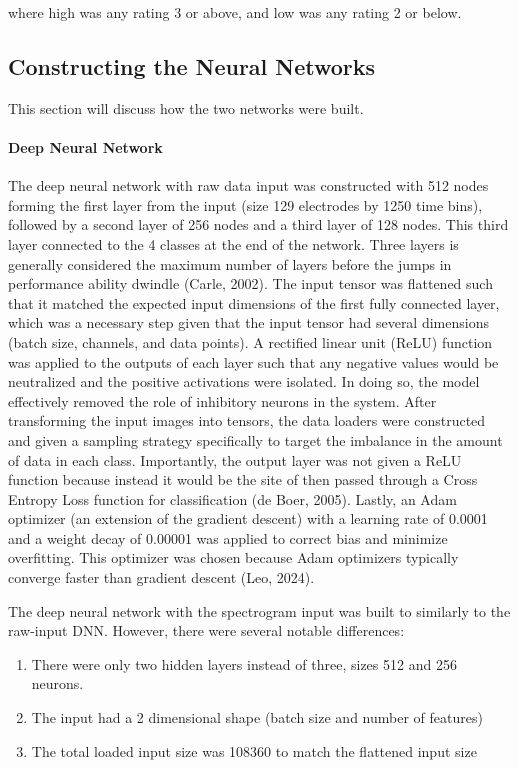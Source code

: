 \documentclass[fleqn,10pt]{SelfArx} %
\begin{document}
where high was any rating 3 or above, and low was any rating 2 or below.

\subsection{Constructing the Neural Networks}

This section will discuss how the two networks were built. 

\paragraph{Deep Neural Network} 

The  deep neural network with raw data input was constructed with 512 nodes forming the first layer from the input (size 129 electrodes by 1250 time bins), followed by a second layer of 256 nodes and a third layer of 128 nodes. This third layer connected to the 4 classes at the end of the network. Three layers is generally considered the maximum number of layers before the jumps in performance ability dwindle (Carle, 2002). The input tensor was flattened such that it matched the expected input dimensions of the first fully connected layer, which was a necessary step given that the input tensor had several dimensions (batch size, channels, and data points). A rectified linear unit (ReLU) function was applied to the outputs of each layer such that any negative values would be neutralized and the positive activations were isolated. In doing so, the model effectively removed the role of inhibitory neurons in the system. After transforming the input images into tensors, the data loaders were constructed and given a sampling strategy specifically to target the imbalance in the amount of data in each class. Importantly, the output layer was not given a ReLU function because instead it would be the site of  then passed through a Cross Entropy Loss function for classification (de Boer, 2005). Lastly, an Adam optimizer (an extension of the gradient descent) with a learning rate of 0.0001 and a weight decay of 0.00001 was applied to correct bias and minimize overfitting. This optimizer was chosen because Adam optimizers typically converge faster than gradient descent (Leo, 2024).

The deep neural network with the spectrogram input was built to similarly to the raw-input DNN. However, there were several notable differences:
\begin{enumerate}
\item There were only two hidden layers instead of three, sizes 512 and 256 neurons.
\item The input had a 2 dimensional shape (batch size and number of features)
\item The total loaded input size was 108360 to match the flattened input size
\end{enumerate}
\end{document}
